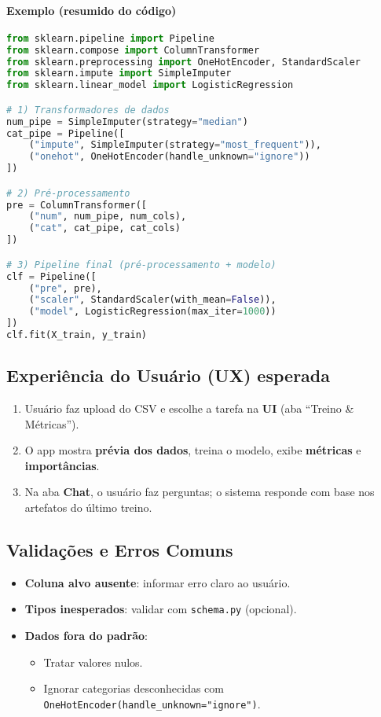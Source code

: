 \documentclass[12pt,a4paper]{article}
\begin{document}
\paragraph{Exemplo (resumido do código)}
\begin{lstlisting}[language=python]
from sklearn.pipeline import Pipeline
from sklearn.compose import ColumnTransformer
from sklearn.preprocessing import OneHotEncoder, StandardScaler
from sklearn.impute import SimpleImputer
from sklearn.linear_model import LogisticRegression

# 1) Transformadores de dados
num_pipe = SimpleImputer(strategy="median")
cat_pipe = Pipeline([
    ("impute", SimpleImputer(strategy="most_frequent")),
    ("onehot", OneHotEncoder(handle_unknown="ignore"))
])

# 2) Pré-processamento
pre = ColumnTransformer([
    ("num", num_pipe, num_cols),
    ("cat", cat_pipe, cat_cols)
])

# 3) Pipeline final (pré-processamento + modelo)
clf = Pipeline([
    ("pre", pre),
    ("scaler", StandardScaler(with_mean=False)),
    ("model", LogisticRegression(max_iter=1000))
])
clf.fit(X_train, y_train)
\end{lstlisting}


\subsection{Experiência do Usuário (UX) esperada}

\begin{enumerate}
  \item Usuário faz upload do CSV e escolhe a tarefa na \textbf{UI} (aba ``Treino \& Métricas'').
  \item O app mostra \textbf{prévia dos dados}, treina o modelo, exibe \textbf{métricas} e \textbf{importâncias}.
  \item Na aba \textbf{Chat}, o usuário faz perguntas; o sistema responde com base nos artefatos do último treino.
\end{enumerate}
\subsection{Validações e Erros Comuns}

\begin{itemize}
  \item \textbf{Coluna alvo ausente}: informar erro claro ao usuário.
  \item \textbf{Tipos inesperados}: validar com \texttt{schema.py} (opcional).
  \item \textbf{Dados fora do padrão}: 
    \begin{itemize}
      \item Tratar valores nulos.  
      \item Ignorar categorias desconhecidas com \lstinline|OneHotEncoder(handle_unknown="ignore")|.  
    \end{itemize}
\end{itemize}
\end{document}
